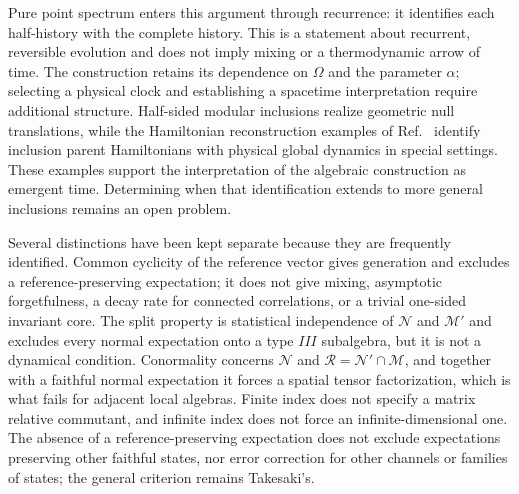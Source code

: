 \documentclass[a4paper,11pt]{article}
\theoremstyle{definition}
\newcommand{\mR}{\mathcal{R}}
\newcommand{\mN}{\mathcal{N}}
\newcommand{\mM}{\mathcal{M}}
\begin{document}
Pure point spectrum enters this argument through recurrence: it identifies each half-history with the complete history. This is a statement about recurrent, reversible evolution and does not imply mixing or a thermodynamic arrow of time. The construction retains its dependence on $\Omega$ and the parameter $\alpha$; selecting a physical clock and establishing a spacetime interpretation require additional structure. Half-sided modular inclusions realize geometric null translations, while the Hamiltonian reconstruction examples of Ref.~\cite{chen2026local} identify inclusion parent Hamiltonians with physical global dynamics in special settings. These examples support the interpretation of the algebraic construction as emergent time. Determining when that identification extends to more general inclusions remains an open problem.

Several distinctions have been kept separate because they are frequently identified. Common cyclicity of the reference vector gives generation and excludes a reference-preserving expectation; it does not give mixing, asymptotic forgetfulness, a decay rate for connected correlations, or a trivial one-sided invariant core. The split property is statistical independence of $\mN$ and $\mM'$ and excludes every normal expectation onto a type $III$ subalgebra, but it is not a dynamical condition. Conormality concerns $\mN$ and $\mR=\mN'\cap\mM$, and together with a faithful normal expectation it forces a spatial tensor factorization, which is what fails for adjacent local algebras. Finite index does not specify a matrix relative commutant, and infinite index does not force an infinite-dimensional one. The absence of a reference-preserving expectation does not exclude expectations preserving other faithful states, nor error correction for other channels or families of states; the general criterion remains Takesaki's.
\end{document}

